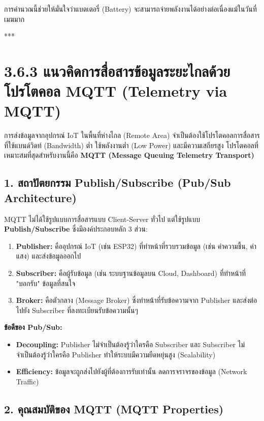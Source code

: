 \documentclass[11pt,a4paper,openany]{report}
\begin{document}
การคำนวณนี้ช่วยให้มั่นใจว่าแบตเตอรี่ (Battery) จะสามารถจ่ายพลังงานได้อย่างต่อเนื่องแม้ในวันที่เมฆมาก

***

\section{3.6.3 แนวคิดการสื่อสารข้อมูลระยะไกลด้วยโปรโตคอล MQTT (Telemetry via MQTT)}


การส่งข้อมูลจากอุปกรณ์ IoT ในพื้นที่ห่างไกล (Remote Area) จำเป็นต้องใช้โปรโตคอลการสื่อสารที่ใช้แบนด์วิดท์ (Bandwidth) ต่ำ ใช้พลังงานต่ำ (Low Power) และมีความเสถียรสูง โปรโตคอลที่เหมาะสมที่สุดสำหรับงานนี้คือ \textbf{MQTT (Message Queuing Telemetry Transport)}

\subsection{1. สถาปัตยกรรม Publish/Subscribe (Pub/Sub Architecture)}


MQTT ไม่ได้ใช้รูปแบบการสื่อสารแบบ Client-Server ทั่วไป แต่ใช้รูปแบบ \textbf{Publish/Subscribe} ซึ่งมีองค์ประกอบหลัก 3 ส่วน:

\begin{enumerate}
  \item \textbf{Publisher:} คืออุปกรณ์ IoT (เช่น ESP32) ที่ทำหน้าที่รวบรวมข้อมูล (เช่น ค่าความชื้น, ค่าแสง) และส่งข้อมูลออกไป
  \item \textbf{Subscriber:} คือผู้รับข้อมูล (เช่น ระบบฐานข้อมูลบน Cloud, Dashboard) ที่ทำหน้าที่ "บอกรับ" ข้อมูลที่สนใจ
  \item \textbf{Broker:} คือตัวกลาง (Message Broker) ซึ่งทำหน้าที่รับข้อความจาก Publisher และส่งต่อไปยัง Subscriber ที่ลงทะเบียนรับข้อความนั้นๆ
\end{enumerate}


\textbf{ข้อดีของ Pub/Sub:}
\begin{itemize}
  \item \textbf{Decoupling:} Publisher ไม่จำเป็นต้องรู้ว่าใครคือ Subscriber และ Subscriber ไม่จำเป็นต้องรู้ว่าใครคือ Publisher ทำให้ระบบมีความยืดหยุ่นสูง (Scalability)
  \item \textbf{Efficiency:} ข้อมูลจะถูกส่งไปยังผู้ที่ต้องการรับเท่านั้น ลดการจราจรของข้อมูล (Network Traffic)
\end{itemize}


\subsection{2. คุณสมบัติของ MQTT (MQTT Properties)}
\end{document}

